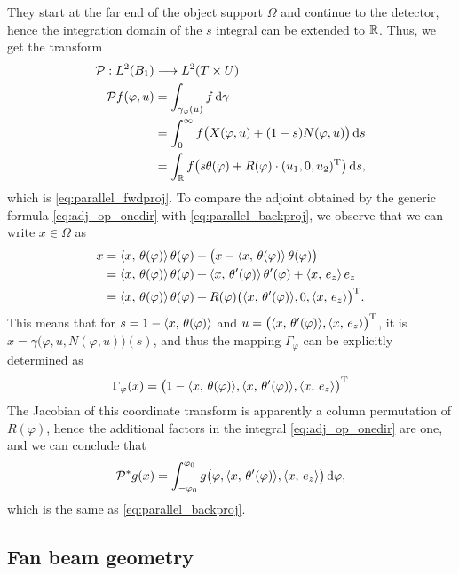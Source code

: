\documentclass{amsart}
\renewcommand*{\phi}{\varphi}
\begin{document}
%
They start at the far end of the object support $\Omega$ and continue to the detector, hence the integration domain of the $s$ 
integral can be extended to ${\mathbb{R}}$. Thus, we get the transform
%
\begin{align*}
 \OPP: L^2(B_1) & \Lto L^2(T \times U) \\
 \OPP f(\phi, u) 
 &= \int_{\gamma_\phi(u)} f\, \D \gamma \\
 &= \int_0^\infty f\big(X(\phi, u) + (1-s) N(\phi, u)\big)\, \D s \\
 &= \int_\RR f\big(s \theta(\phi) + R(\phi) \cdot \TRANSP{(u_1, 0, u_2)}\big)\, \D s,
\end{align*}
%
which is \eqref{eq:parallel_fwdproj}. To compare the adjoint obtained by the generic formula \eqref{eq:adj_op_onedir} with 
\eqref{eq:parallel_backproj}, we observe that we can write $x \in \Omega$ as
%
\begin{align*}
 x 
 &= \INNER{x}{\theta(\phi)}\, \theta(\phi) + \big(x - \INNER{x}{\theta(\phi)}\, \theta(\phi)\big) \\
 &= \INNER{x}{\theta(\phi)}\, \theta(\phi) + \INNER{x}{\theta'(\phi)}\, \theta'(\phi) + \INNER{x}{e_z}\, e_z \\
 &= \INNER{x}{\theta(\phi)}\, \theta(\phi) + R(\phi) \TRANSP{\big(\INNER{x}{\theta'(\phi)}, 0, \INNER{x}{e_z}\big)}.
\end{align*}
%
This means that for $s = 1 - \INNER{x}{\theta(\phi)}$ and $u = \TRANSP{\big(\INNER{x}{\theta'(\phi)}, \INNER{x}{e_z}\big)}$, it is 
$x = \gamma\big(\phi, u, N(\phi, u)\big)(s)$, and thus the mapping $\Gamma_\phi$ can be explicitly determined as
%
\begin{equation*}
 \Gamma_\phi(x) = \TRANSP{\big(1 - \INNER{x}{\theta(\phi)}, \INNER{x}{\theta'(\phi)}, \INNER{x}{e_z}\big)}
\end{equation*}
%
The Jacobian of this coordinate transform is apparently a column permutation of $R(\phi)$, hence the additional factors in the integral 
\eqref{eq:adj_op_onedir} are one, and we can conclude that
%
\begin{equation*}
 \DUALOPP g(x) = \int_{-\phi_0}^{\phi_0} g\big(\phi, \INNER{x}{\theta'(\phi)}, \INNER{x}{e_z}\big)\, \D\phi,
\end{equation*}
%
which is the same as \eqref{eq:parallel_backproj}.



\subsection{Fan beam geometry}
\end{document}
